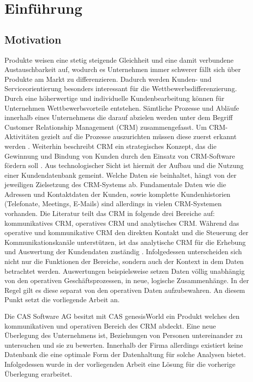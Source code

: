 \chapter{Einführung}
\label{ch:Einfuehrung}

\section{Motivation}
\label{ch:Einfuehrung:sec:Motivation}

Produkte weisen eine stetig steigende Gleichheit und eine damit verbundene Austauschbarkeit auf, wodurch es Unternehmen immer schwerer fällt sich über Produkte am Markt zu differenzieren. Dadurch werden Kunden- und Serviceorientierung besonders interessant für die Wettbewerbsdifferenzierung. Durch eine höherwertige und individuelle Kundenbearbeitung können für Unternehmen Wettbewerbsvorteile entstehen. Sämtliche Prozesse und Abläufe innerhalb eines Unternehmens die darauf abzielen werden unter dem Begriff Customer Relationship Management (CRM) zusammengefasst. Um CRM-Aktivitäten gezielt auf die Prozesse auszurichten müssen diese zuerst erkannt werden \cite{SWB-1001}. Weiterhin beschreibt CRM ein strategisches Konzept, das die Gewinnung und Bindung von Kunden durch den Einsatz von CRM-Software fördern soll \cite{SWB-1001}. Aus technologischer Sicht ist hiermit der Aufbau und die Nutzung einer Kundendatenbank gemeint. Welche Daten sie beinhaltet, hängt von der jeweiligen Zielsetzung des CRM-Systems ab. Fundamentale Daten wie die Adressen und Kontaktdaten der Kunden, sowie komplette Kundenhistorien (Telefonate, Meetings, E-Mails) sind allerdings in vielen CRM-Systemen vorhanden. Die Literatur teilt das CRM in folgende drei Bereiche auf: kommunikatives CRM, operatives CRM und analytisches CRM. Während das operative und kommunikative CRM den direkten Kontakt und die Steuerung der Kommunikationskanäle unterstützen, ist das analytische CRM für die Erhebung und Auswertung der Kundendaten zuständig \cite{SWB-375372644}. Infolgedessen unterscheiden sich nicht nur die Funktionen der Bereiche, sondern auch der Kontext in dem Daten betrachtet werden. Auswertungen beispielsweise setzen Daten völlig unabhängig von den operativen Geschäftsprozessen, in neue, logische Zusammenhänge. In der Regel gilt es diese separat von den operativen Daten aufzubewahren. An diesem Punkt setzt die vorliegende Arbeit an. 

Die CAS Software AG besitzt mit CAS genesisWorld ein Produkt welches den kommunikativen und operativen Bereich des CRM abdeckt. Eine neue Überlegung des Unternehmens ist, Beziehungen von Personen untereinander zu untersuchen und sie zu bewerten. Innerhalb der Firma allerdings existiert keine Datenbank die eine optimale Form der Datenhaltung für solche Analysen bietet. Infolgedessen wurde in der vorliegenden Arbeit eine Lösung für die vorherige Überlegung erarbeitet.


